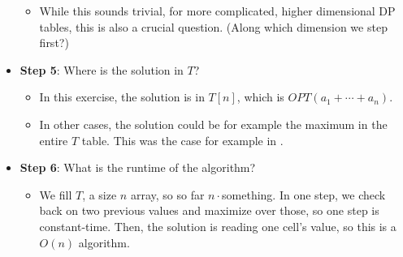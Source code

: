 \begin{itemize}
\begin{itemize}
        \item While this sounds trivial, for more complicated, higher dimensional DP tables, this is also a crucial question. (Along which dimension we step first?)
    \end{itemize}
    \item \textbf{Step 5}: Where is the solution in $T$?
    \begin{itemize}
        \item In this exercise, the solution is in $T[n]$, which is $OPT(a_1 + \cdots{} + a_n)$.
        \item In other cases, the solution could be for example the maximum in the entire $T$ table. This was the case for example in .
    \end{itemize}
    \item \textbf{Step 6}: What is the runtime of the algorithm?
    \begin{itemize}
        \item We fill $T$, a size $n$ array, so so far $n\cdot{}$something. In one step, we check back on two previous values and maximize over those, so one step is constant-time. Then, the solution is reading one cell's value, so this is a $O(n)$ algorithm.
    \end{itemize}
\end{itemize}
